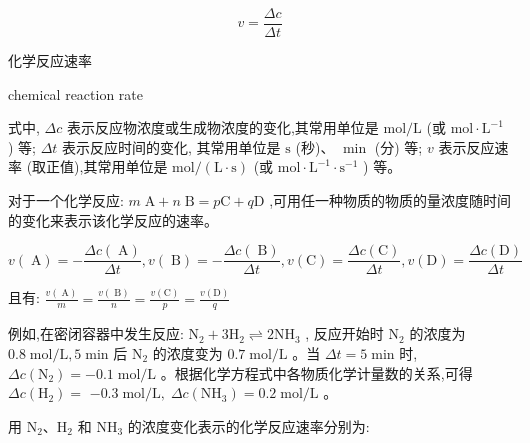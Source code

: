 \documentclass[10pt]{article}
\begin{document}
\[
v = \frac{\Delta c}{\Delta t}
\]

\begin{mdframed}

化学反应速率

chemical reaction rate

\end{mdframed}

式中, \({\Delta c}\) 表示反应物浓度或生成物浓度的变化,其常用单位是 \(\mathrm{{mol}}/\mathrm{L}\) (或 \(\mathrm{{mol}} \cdot {\mathrm{L}}^{-1}\) ) 等; \({\Delta t}\) 表示反应时间的变化, 其常用单位是 \(\mathrm{s}\) (秒)、 \(\min\) (分) 等; \(v\) 表示反应速率 (取正值),其常用单位是 \(\mathrm{{mol}}/\left( {\mathrm{L} \cdot \mathrm{s}}\right)\) (或 \(\mathrm{{mol}} \cdot {\mathrm{L}}^{-1} \cdot {\mathrm{s}}^{-1}\) ) 等。

对于一个化学反应: \(m\mathrm{\;A} + n\mathrm{\;B} = p\mathrm{C} + q\mathrm{D}\) ,可用任一种物质的物质的量浓度随时间的变化来表示该化学反应的速率。

\[
v\left( \mathrm{\;A}\right) = - \frac{{\Delta c}\left( \mathrm{\;A}\right) }{\Delta t},v\left( \mathrm{\;B}\right) = - \frac{{\Delta c}\left( \mathrm{\;B}\right) }{\Delta t},v\left( \mathrm{C}\right) = \frac{{\Delta c}\left( \mathrm{C}\right) }{\Delta t},v\left( \mathrm{D}\right) = \frac{{\Delta c}\left( \mathrm{D}\right) }{\Delta t}
\]


且有: \(\frac{v\left( \mathrm{\;A}\right) }{m} = \frac{v\left( \mathrm{\;B}\right) }{n} = \frac{v\left( \mathrm{C}\right) }{p} = \frac{v\left( \mathrm{D}\right) }{q}\)

例如,在密闭容器中发生反应: \({\mathrm{N}}_{2} + 3{\mathrm{H}}_{2} \rightleftharpoons 2{\mathrm{{NH}}}_{3}\) , 反应开始时 \({\mathrm{N}}_{2}\) 的浓度为 \({0.8}\mathrm{\;{mol}}/\mathrm{L},5\mathrm{\;{min}}\) 后 \({\mathrm{N}}_{2}\) 的浓度变为 \({0.7}\mathrm{\;{mol}}/\mathrm{L}\) 。当 \({\Delta t} = 5\mathrm{\;{min}}\) 时, \({\Delta c}\left( {\mathrm{N}}_{2}\right) = - {0.1}\mathrm{\;{mol}}/\mathrm{L}\) 。根据化学方程式中各物质化学计量数的关系,可得 \({\Delta c}\left( {\mathrm{H}}_{2}\right) =\) \(- {0.3}\mathrm{\;{mol}}/\mathrm{L},\;{\Delta c}\left( {\mathrm{{NH}}}_{3}\right) = {0.2}\mathrm{\;{mol}}/\mathrm{L}\) 。

用 \({\mathrm{N}}_{2}\text{、}{\mathrm{H}}_{2}\) 和 \({\mathrm{{NH}}}_{3}\) 的浓度变化表示的化学反应速率分别为:
\end{document}
